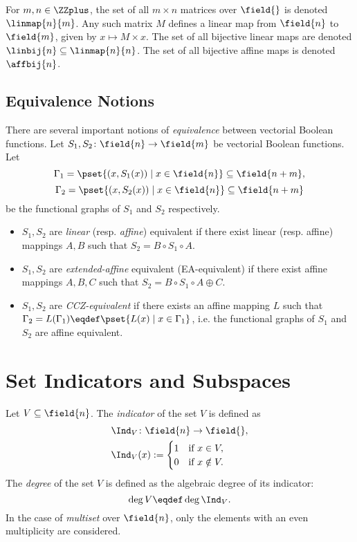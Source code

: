 For $m,n \in \ZZplus$, the set of all $m \times n$ matrices over $\field{}$ is denoted $\linmap{n}{m}$. Any such matrix $M$ defines a linear map from $\field{n}$ to $\field{m}$, given by $x \mapsto M\times x$. The set of all bijective linear maps are denoted $\linbij{n} \subseteq \linmap{n}{n}$. The set of all bijective affine maps is denoted $\affbij{n}$.


\subsection{Equivalence Notions}
There are several important notions of \emph{equivalence} between vectorial Boolean functions. Let $S_1,S_2\colon \field{n} \to \field{m}$ be vectorial Boolean functions. Let
$$\Gamma_1 = \pset{(x, S_1(x)) \mid x \in \field{n}} \subseteq \field{n+m},$$ 
$$\Gamma_2 = \pset{(x, S_2(x)) \mid x \in \field{n}} \subseteq \field{n+m}$$
be the functional graphs of $S_1$ and $S_2$ respectively.

\begin{itemize}
    \item $S_1, S_2$ are \emph{linear} (resp. \emph{affine}) equivalent if there exist linear (resp. affine) mappings $A,B$ such that $S_2 = B \circ S_1 \circ A$.
    
    \item $S_1, S_2$ are \emph{extended-affine} equivalent (EA-equivalent) if there exist affine mappings $A,B,C$ such that $S_2 = B \circ S_1 \circ A \oplus C$.
    
    \item $S_1, S_2$ are \emph{CCZ-equivalent} if there exists an affine mapping $L$ such that $\Gamma_2 = L(\Gamma_1) \eqdef \pset{L(x) \mid x \in \Gamma_1}$, i.e. the functional graphs of $S_1$ and $S_2$ are affine equivalent.
\end{itemize}



\section{Set Indicators and Subspaces}
Let $V \subseteq \field{n}$. The \emph{indicator} of the set $V$ is defined as
\begin{align*}
& \Ind_V\colon \field{n} \to \field{},\\
& \Ind_V(x) :=
    \begin{cases}
    1 &\text{if } x \in V, \\
    0 &\text{if } x \notin V.
    \end{cases}
\end{align*}
The \emph{degree} of the set $V$ is defined as the algebraic degree of its indicator:
$$
\deg{V} \eqdef \deg{\Ind_V}.
$$
In the case of \emph{multiset} over $\field{n}$, only the elements with an even multiplicity are considered.

